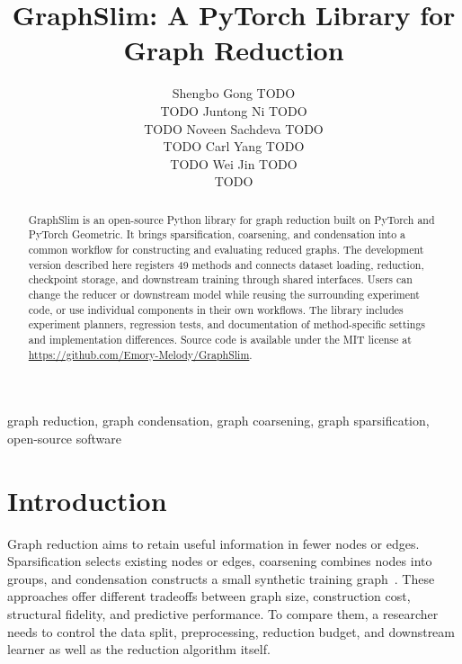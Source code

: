 \documentclass[twoside,11pt]{article}
\begin{document}
\title{GraphSlim: A PyTorch Library for Graph Reduction}

\author{
\name Shengbo Gong \email TODO \\
\addr TODO
\AND
\name Juntong Ni \email TODO \\
\addr TODO
\AND
\name Noveen Sachdeva \email TODO \\
\addr TODO
\AND
\name Carl Yang \email TODO \\
\addr TODO
\AND
\name Wei Jin \email TODO \\
\addr TODO
}
\editor{}
\maketitle

\begin{abstract}
GraphSlim is an open-source Python library for graph reduction built on PyTorch
and PyTorch Geometric. It brings sparsification, coarsening, and condensation
into a common workflow for constructing and evaluating reduced graphs. The
development version described here registers 49 methods and connects dataset
loading, reduction, checkpoint storage, and downstream training through shared
interfaces. Users can change the reducer or downstream model while reusing the
surrounding experiment code, or use individual components in their own workflows.
The library includes experiment planners, regression tests, and documentation of
method-specific settings and implementation differences. Source code is available
under the MIT license at
\url{https://github.com/Emory-Melody/GraphSlim}.
\end{abstract}

\begin{keywords}
graph reduction, graph condensation, graph coarsening, graph sparsification,
open-source software
\end{keywords}

\section{Introduction}

Graph reduction aims to retain useful information in fewer nodes or edges.
Sparsification selects existing nodes or edges, coarsening combines nodes into
groups, and condensation constructs a small synthetic training
graph~\citep{hashemi2024comprehensive}. These approaches offer different tradeoffs
between graph size, construction cost, structural fidelity, and predictive
performance. To compare them, a researcher needs to control the data split,
preprocessing, reduction budget, and downstream learner as well as the reduction
algorithm itself.
\end{document}
